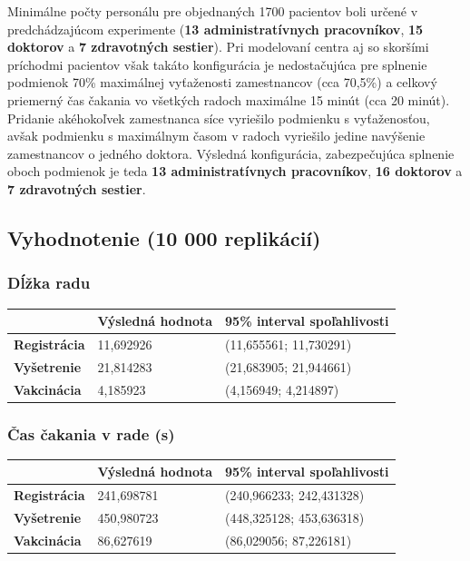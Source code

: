 \documentclass[letterpaper]{article}
\begin{document}
	Minimálne počty personálu pre objednaných 1700 pacientov boli určené v predchádzajúcom experimente (\textbf{13 administratívnych pracovníkov}, \textbf{15 doktorov} a \textbf{7 zdravotných sestier}). Pri modelovaní centra aj so skoršími príchodmi pacientov však takáto konfigurácia je nedostačujúca pre splnenie podmienok 70\% maximálnej vyťaženosti zamestnancov (cca 70,5\%) a celkový priemerný čas čakania vo všetkých radoch maximálne 15 minút (cca 20 minút). Pridanie akéhokoľvek zamestnanca síce vyriešilo podmienku s vyťaženosťou, avšak podmienku s maximálnym časom v radoch vyriešilo jedine navýšenie zamestnancov o jedného doktora. Výsledná konfigurácia, zabezpečujúca splnenie oboch podmienok je teda \textbf{13 administratívnych pracovníkov}, \textbf{16 doktorov} a \textbf{7 zdravotných sestier}.
	
	\subsection*{Vyhodnotenie (10 000 replikácií)}
	
	\subsubsection*{Dĺžka radu}
	
	\begin{table}[hbt!]
		\begin{tabular}{p{6cm}|p{4.5cm}p{4.5cm}}
			& \textbf{Výsledná hodnota} & \textbf{95\% interval spoľahlivosti} \\
			\hline\hline
			\textbf{Registrácia} 	& 11,692926           & (11,655561; 11,730291)			
			\\\hline
			\textbf{Vyšetrenie}  	& 21,814283           & (21,683905; 21,944661)	
			\\\hline
			\textbf{Vakcinácia}  	& 4,185923            & (4,156949; 4,214897)
		\end{tabular}
	\end{table}
	
	\newpage
	
	\subsubsection*{Čas čakania v rade (s)}
	
	\begin{table}[hbt!]
		\begin{tabular}{p{6cm}|p{4.5cm}p{4.5cm}}
			& \textbf{Výsledná hodnota} & \textbf{95\% interval spoľahlivosti} \\
			\hline\hline
			\textbf{Registrácia} 	& 241,698781          & (240,966233; 242,431328)			
			\\\hline
			\textbf{Vyšetrenie}  	& 450,980723          & (448,325128; 453,636318)	
			\\\hline
			\textbf{Vakcinácia}  	& 86,627619           & (86,029056; 87,226181)
		\end{tabular}
	\end{table}
	
\end{document}
